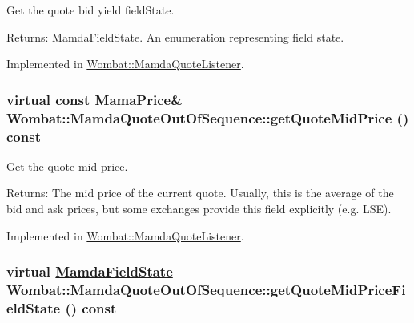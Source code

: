 Get the quote bid yield field\-State. 

\begin{Desc}
\item[Returns:]Mamda\-Field\-State. An enumeration representing field state. \end{Desc}


Implemented in \hyperlink{classWombat_1_1MamdaQuoteListener_9208a03480064d6bd80ed3b95136c752}{Wombat::Mamda\-Quote\-Listener}.\hypertarget{classWombat_1_1MamdaQuoteOutOfSequence_fa1e82ccf6a101f0581a557399ea9adc}{
\subsubsection[getQuoteMidPrice]{\setlength{\rightskip}{0pt plus 5cm}virtual const Mama\-Price\& Wombat::Mamda\-Quote\-Out\-Of\-Sequence::get\-Quote\-Mid\-Price () const}}
\label{classWombat_1_1MamdaQuoteOutOfSequence_fa1e82ccf6a101f0581a557399ea9adc}


Get the quote mid price. 

\begin{Desc}
\item[Returns:]The mid price of the current quote. Usually, this is the average of the bid and ask prices, but some exchanges provide this field explicitly (e.g. LSE). \end{Desc}


Implemented in \hyperlink{classWombat_1_1MamdaQuoteListener_b74788d3c90fce551bab93ed062a0458}{Wombat::Mamda\-Quote\-Listener}.\hypertarget{classWombat_1_1MamdaQuoteOutOfSequence_52c9ce74d5b5b74fd48280cac925ce8d}{
\subsubsection[getQuoteMidPriceFieldState]{\setlength{\rightskip}{0pt plus 5cm}virtual \hyperlink{namespaceWombat_93aac974f2ab713554fd12a1fa3b7d2a}{Mamda\-Field\-State} Wombat::Mamda\-Quote\-Out\-Of\-Sequence::get\-Quote\-Mid\-Price\-Field\-State () const}}
\label{classWombat_1_1MamdaQuoteOutOfSequence_52c9ce74d5b5b74fd48280cac925ce8d}


